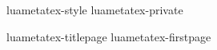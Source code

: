 

%
%


%




\enabletrackers[system.usage=summary]

\environment luametatex-style
\environment luametatex-private

\startdocument
  [manual=LuaMeta\TeX,
   version=\cldcontext{status.luatex_verbose}]

\component luametatex-titlepage
\component luametatex-firstpage

